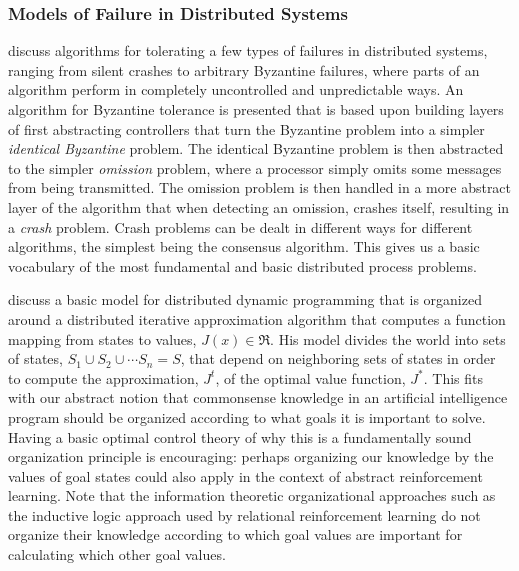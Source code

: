 {}

\subsubsection{Models of Failure in Distributed Systems}

\cite{attiya:2004} discuss algorithms for tolerating a few types of failures in distributed systems, ranging from silent crashes to arbitrary Byzantine failures, where parts of an algorithm perform in completely uncontrolled and unpredictable ways.
An algorithm for Byzantine tolerance is presented that is based upon building layers of first abstracting controllers that turn the Byzantine problem into a simpler \emph{identical Byzantine} problem.
The identical Byzantine problem is then abstracted to the simpler \emph{omission} problem, where a processor simply omits some messages from being transmitted.
The omission problem is then handled in a more abstract layer of the algorithm that when detecting an omission, crashes itself, resulting in a \emph{crash} problem.
Crash problems can be dealt in different ways for different algorithms, the simplest being the consensus algorithm.
This gives us a basic vocabulary of the most fundamental and basic distributed process problems.

\cite{bertsekas:1982} discuss a basic model for distributed dynamic programming that is organized around a distributed iterative approximation algorithm that computes a function mapping from states to values, $J(x){\in}\Re$.
His model divides the world into sets of states, $S_1 \cup S_2 \cup \cdots S_n = S$, that depend on neighboring sets of states in order to compute the approximation, $J^t$, of the optimal value function, $J^*$.
This fits with our abstract notion that commonsense knowledge in an artificial intelligence program should be organized according to what goals it is important to solve.
Having a basic optimal control theory of why this is a fundamentally sound organization principle is encouraging: perhaps organizing our knowledge by the values of goal states could also apply in the context of abstract reinforcement learning.
Note that the information theoretic organizational approaches such as the inductive logic approach used by relational reinforcement learning do not organize their knowledge according to which goal values are important for calculating which other goal values.

